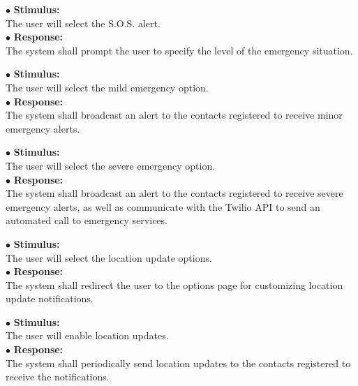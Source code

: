 \documentclass{scrreprt}
\begin{document}
\vspace{4mm}
	\hspace{-4.75mm} $\bullet$ \textbf{Stimulus:} \\ \hspace{5mm} The user will select the S.O.S. alert.\\
	$\bullet$ \textbf{Response:} \\ \hspace{5mm} The system shall prompt the user to specify the level of the emergency situation.

\vspace{4mm}
	\hspace{-4.75mm} $\bullet$ \textbf{Stimulus:} \\ \hspace{5mm} The user will select the mild emergency option.\\
	$\bullet$ \textbf{Response:} \\ \hspace{5mm} The system shall broadcast an alert to the contacts registered to receive minor emergency alerts.

\vspace{5mm}
	\hspace{-4.75mm} $\bullet$ \textbf{Stimulus:} \\ \hspace{5mm} The user will select the severe emergency option.\\
	$\bullet$ \textbf{Response:} \\ \hspace{5mm} The system shall broadcast an alert to the contacts registered to receive severe emergency alerts, as well as communicate with the Twilio API to send an automated call to emergency services.

\vspace{4mm}
	\hspace{-4.75mm} $\bullet$ \textbf{Stimulus:} \\ \hspace{5mm} The user will select the location update options.\\
	$\bullet$ \textbf{Response:} \\ \hspace{5mm} The system shall redirect the user to the options page for customizing location update notifications.

\vspace{4mm}
	\hspace{-4.75mm} $\bullet$ \textbf{Stimulus:} \\ \hspace{5mm} The user will enable location updates.\\
	$\bullet$ \textbf{Response:} \\ \hspace{5mm} The system shall periodically send location updates to the contacts registered to receive the notifications.
	
\end{document}

